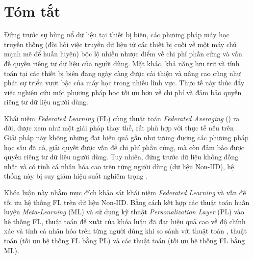 \chapter*{Tóm tắt}
\label{abstract}

Đứng trước sự bùng nổ dữ liệu tại thiết bị biên, các phương pháp máy học truyền thống (đòi hỏi việc truyền dữ liệu từ các thiết bị cuối về một máy chủ mạnh mẽ để huấn luyện) bộc lộ nhiều nhược điểm về chi phí phần cứng và vấn đề quyền riêng tư dữ liệu của người dùng. Mặt khác, khả năng lưu trữ và tính toán tại các thiết bị biên đang ngày càng được cải thiện và nâng cao cũng như phát sự triển vượt bậc của máy học trong nhiều lĩnh vực. Thực tế này thúc đẩy việc nghiên cứu một phương pháp học tối ưu hơn về chi phí và đảm bảo quyền riêng tư dữ liệu người dùng.

Khái niệm \textit{Federated Learning} (FL) cùng thuật toán \textit{Federated Averaging} () ra đời, được xem như một giải pháp thay thế, rất phù hợp với thực tế nêu trên \cite{mcmahan2017communication}. Giải pháp này không những đạt hiệu quả gần như tương đương các phương pháp học sâu đã có, giải quyết được vấn đề chi phí phần cứng, mà còn đảm bảo được quyền riêng tư dữ liệu người dùng. Tuy nhiên, đứng trước dữ liệu không đồng nhất và có tính cá nhân hóa cao trên từng người dùng (dữ liệu Non-IID), hệ thống này bị suy giảm hiệu suất nghiêm trọng \cite{zhao2018federated}.

Khóa luận này nhằm mục đích khảo sát khái niệm \textit{Federated Learning} và vấn đề tối ưu hệ thống FL trên dữ liệu Non-IID. Bằng cách kết hợp các thuật toán huấn luyện \textit{Meta-Learning} \cite{hospedales2020meta} (ML) và sử dụng kỹ thuật \textit{Personalization Layer} \cite{zhu2021federated} (PL) vào hệ thống FL, thuật toán đề xuất của khóa luận đã đạt hiệu quả cao về độ chính xác và tính cá nhân hóa trên từng người dùng khi so sánh với thuật toán , thuật toán  \cite{arivazhagan2019federated} (tối ưu hệ thống FL bằng PL) và các thuật toán  \cite{chen2018federated} (tối ưu hệ thống FL bằng ML).
